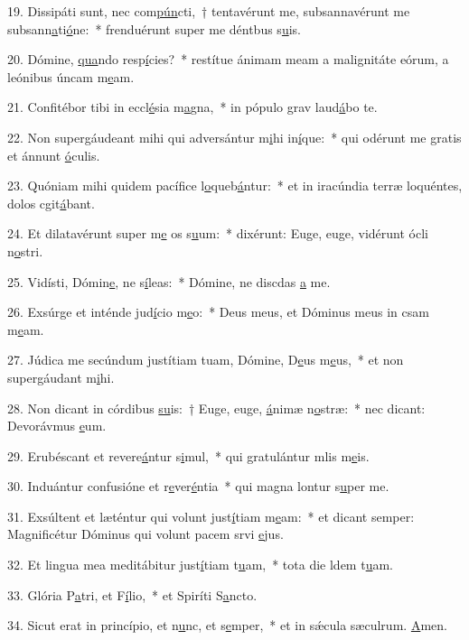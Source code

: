 19. Dissipáti sunt, nec com\uline{pún}cti,~† tentavérunt me, subsannavérunt me subsann\uline{a}ti\uline{ó}ne:~* frenduérunt super me déntbus s\uline{u}is.\par 
20. Dómine, \uline{qua}ndo resp\uline{í}cies?~* restítue ánimam meam a malignitáte eórum, a leónibus úncam m\uline{e}am.\par 
21. Confitébor tibi in eccl\uline{é}sia m\uline{a}gna,~* in pópulo grav laud\uline{á}bo te.\par 
22. Non supergáudeant mihi qui adversántur m\uline{i}hi in\uline{í}que:~* qui odérunt me gratis et ánnunt \uline{ó}culis.\par 
23. Quóniam mihi quidem pacífice l\uline{o}queb\uline{á}ntur:~* et in iracúndia terræ loquéntes, dolos cgit\uline{á}bant.\par 
24. Et dilatavérunt super m\uline{e} os s\uline{u}um:~* dixérunt: Euge, euge, vidérunt ócli n\uline{o}stri.\par 
25. Vidísti, Dómin\uline{e}, ne s\uline{í}leas:~* Dómine, ne discdas \uline{a} me.\par 
26. Exsúrge et inténde jud\uline{í}cio m\uline{e}o:~* Deus meus, et Dóminus meus in csam m\uline{e}am.\par 
27. Júdica me secúndum justítiam tuam, Dómine, D\uline{e}us m\uline{e}us,~* et non supergáudant m\uline{i}hi.\par 
28. Non dicant in córdibus \uline{su}is:~† Euge, euge, \uline{á}nimæ n\uline{o}stræ:~* nec dicant: Devorávmus \uline{e}um.\par 
29. Erubéscant et revere\uline{á}ntur s\uline{i}mul,~* qui gratulántur mlis m\uline{e}is.\par 
30. Induántur confusióne et r\uline{e}ver\uline{é}ntia~* qui magna lontur s\uline{u}per me.\par 
31. Exsúltent et læténtur qui volunt just\uline{í}tiam m\uline{e}am:~* et dicant semper: Magnificétur Dóminus qui volunt pacem srvi \uline{e}jus.\par 
32. Et lingua mea meditábitur just\uline{í}tiam t\uline{u}am,~* tota die ldem t\uline{u}am.\par 
33. Glória P\uline{a}tri, et F\uline{í}lio,~* et Spiríti S\uline{a}ncto.\par 
34. Sicut erat in princípio, et n\uline{u}nc, et s\uline{e}mper,~* et in sǽcula sæculrum. \uline{A}men.\par 

